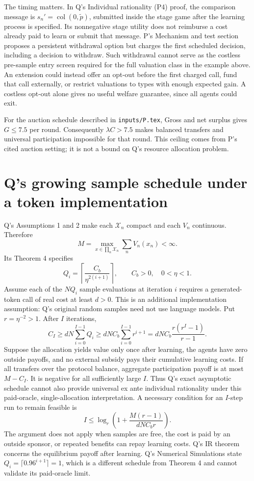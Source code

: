 \documentclass{article}
\begin{document}
The timing matters. In Q's Individual rationality (P4) proof, the
comparison message is \(s_n'=\operatorname{col}(0,\tilde p)\), submitted
inside the stage game after the learning process is specified. Its
nonnegative stage utility does not reimburse a cost already paid to learn
or submit that message. P's Mechanism and test section proposes a persistent
withdrawal option but charges the first scheduled decision, including a
decision to withdraw. Such withdrawal cannot serve as the costless
pre-sample entry screen required for the full valuation class in the
example above. An extension could instead offer an opt-out before the
first charged call, fund that call externally, or restrict valuations to
types with enough expected gain. A costless opt-out alone gives no useful
welfare guarantee, since all agents could exit.

For the auction schedule described in \texttt{inputs/P.tex}, Gross and net
surplus gives \(G\leq7.5\) per round. Consequently
\(\lambda C>7.5\) makes balanced transfers and universal participation
impossible for that round. This ceiling comes from P's cited auction setting;
it is not a bound on Q's resource allocation problem.

\section*{Q's growing sample schedule under a token implementation}
Q's Assumptions 1 and 2 make each \(\mathcal X_n\) compact and each
\(V_n\) continuous. Therefore
\[
M=\max_{x\in\prod_n\mathcal X_n}\sum_n V_n(x_n)<\infty.
\]
Its Theorem 4 specifies
\[
Q_i=\left\lceil\frac{C_b}{\eta^{2(i+1)}}\right\rceil,
\qquad C_b>0,\quad 0<\eta<1.
\]
Assume each of the \(NQ_i\) sample evaluations at iteration \(i\)
requires a generated-token call of real cost at least \(d>0\). This is an
additional implementation assumption: Q's original random samples need not
use language models. Put \(r=\eta^{-2}>1\). After \(I\) iterations,
\[
C_I\geq dN\sum_{i=0}^{I-1}Q_i
\geq dNC_b\sum_{i=0}^{I-1}r^{i+1}
=dNC_b\frac{r(r^I-1)}{r-1}.
\]
Suppose the allocation yields value only once after learning, the agents
have zero outside payoffs, and no external subsidy pays their cumulative
learning costs. If all transfers over the protocol balance, aggregate
participation payoff is at most \(M-C_I\). It is negative for all
sufficiently large \(I\). Thus Q's exact asymptotic schedule cannot also
provide universal ex ante individual rationality under this paid-oracle,
single-allocation interpretation. A necessary condition for an \(I\)-step
run to remain feasible is
\[
I\leq\log_r\!\left(1+\frac{M(r-1)}{dNC_b r}\right).
\]
The argument does not apply when samples are free, the cost is paid by an
outside sponsor, or repeated benefits can repay learning costs. Q's IR
theorem concerns the equilibrium payoff after learning. Q's Numerical
Simulations state \(Q_i=\lceil0.96^{i+1}\rceil=1\), which is a different
schedule from Theorem 4 and cannot validate its paid-oracle limit.
\end{document}
